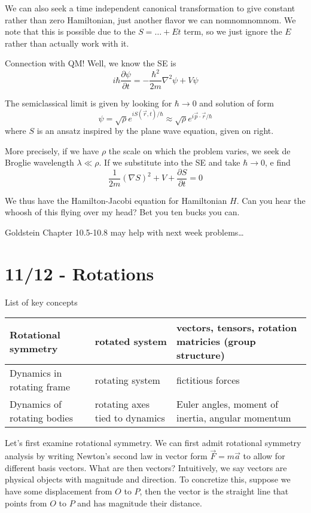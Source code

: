 \documentclass[10pt]{report}
\newcommand{\pd}[2]{\frac{\partial #1}{\partial#2}}
\begin{document}
We can also seek a time independent canonical transformation to give constant rather than zero Hamiltonian, just another flavor we can nomnomnomnom. We note that this is possible due to the $S = \dots + Et$ term, so we just ignore the $E$ rather than actually work with it. 

Connection with QM! Well, we know the SE is
$$i\hbar \pd{\psi}{t} = -\frac{\hbar^2}{2m}\nabla^2 \psi + V\psi$$

The semiclassical limit is given by looking for $\hbar \to 0$ and solution of form 
$$\psi =\sqrt{\rho}e^{iS(\vec{r},t)/\hbar} \approx \sqrt{\rho}e^{i\vec{p}\cdot \vec{r}/\hbar}$$
where $S$ is an ansatz inspired by the plane wave equation, given on right.

More precisely, if we have $\rho$ the scale on which the problem varies, we seek de Broglie wavelength $\lambda \ll \rho$. If we substitute into the SE and take $\hbar \to 0$, e find
$$\frac{1}{2m}(\nabla S)^2 + V + \pd{S}{t} = 0$$

We thus have the Hamilton-Jacobi equation for Hamiltonian $H$. Can you hear the whoosh of this flying over my head? Bet you ten bucks you can.

Goldstein Chapter 10.5-10.8 may help with next week problems\dots
\chapter{11/12 - Rotations}

List of key concepts
\begin{table}[!h]
    \centering
    \begin{tabular}{l|l|l}
        Rotational symmetry & rotated system & vectors, tensors, rotation matricies (group structure)\\\hline
        Dynamics in rotating frame & rotating system & fictitious forces\\\hline
        Dynamics of rotating bodies & rotating axes tied to dynamics & Euler angles, moment of inertia, angular momentum
    \end{tabular}
\end{table}

Let's first examine rotational symmetry. We can first admit rotational symmetry analysis by writing Newton's second law in vector form $\vec{F}=m\vec{a}$ to allow for different basis vectors. What are then vectors? Intuitively, we say vectors are physical objects with magnitude and direction. To concretize this, suppose we have some displacement from $O$ to $P$, then the vector is the straight line that points from $O$ to $P$ and has magnitude their distance. 
\end{document}
